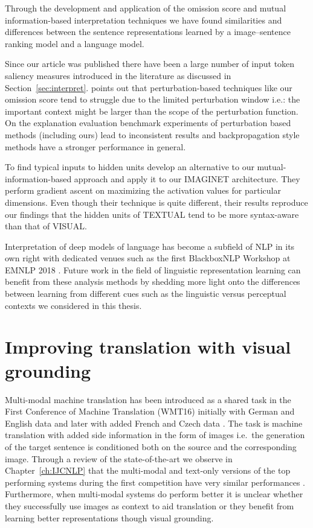 Through the development and application of the omission score and 
mutual information-based interpretation techniques we have found similarities and differences between
the sentence representations learned by a image--sentence ranking model 
and a language model. 

Since our article was published there have been a large number of input token saliency 
measures introduced in the literature as discussed in Section~\ref{sec:interpret}. 
\cite{shrikumar2017learning}
points out that perturbation-based techniques like our omission score tend to struggle
 due to the limited perturbation window i.e.: the
important context might be larger than the scope of the perturbation function. 
On the explanation evaluation benchmark experiments of \cite{poerner2018evaluating} 
perturbation based methods (including ours) lead to inconsistent results and backpropagation style
methods \citep{bach2015pixel,shrikumar2017learning} have a stronger performance in general.

To find typical inputs to hidden units \cite{poerner2018interpretable} develop an alternative
to our mutual-information-based approach and apply it to our \textsc{IMAGINET} architecture.
They perform gradient ascent on maximizing the activation values for particular dimensions.
Even though their technique is quite different, their results reproduce our findings that the hidden 
units of \textsc{TEXTUAL} tend to be more syntax-aware than that of \textsc{VISUAL}.

Interpretation of deep models of language has become a subfield of NLP in its own right
with dedicated venues such as the first BlackboxNLP Workshop at EMNLP 2018
\citep{alishahi2019analyzing}. Future work in the field of linguistic representation learning
can benefit from these analysis methods by shedding more light onto the differences between
learning from different cues such as the linguistic versus perceptual contexts we considered in 
this thesis.



\section{Improving translation with visual grounding}

Multi-modal machine translation has been introduced as a shared task in the
First Conference of Machine Translation (WMT16) \citep{Specia2016} initially with
German and English data  \citep{W16-3210} and
later with added French and Czech data \citep{elliott2017findings}. The task is 
machine translation with added side information in the form of images i.e.\ the generation of the target sentence 
is conditioned both on the source and the corresponding image.
Through a review of the state-of-the-art we observe in Chapter~\ref{ch:IJCNLP} 
that the multi-modal and text-only versions of 
the top performing systems during the first competition
have very similar performances \citep{Specia2016}. 
Furthermore, when multi-modal systems do perform better it is unclear whether they successfully use images as 
context to aid translation or they benefit from learning better representations though visual grounding.

